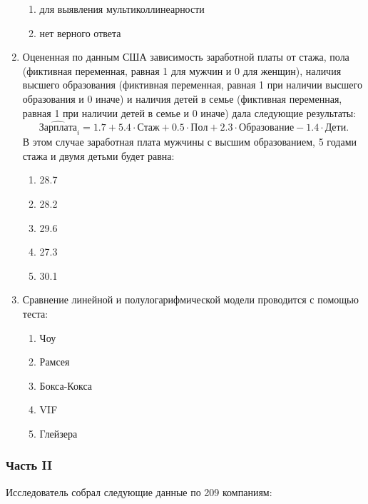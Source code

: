 \begin{enumerate}
\begin{enumerate}
	\item для выявления мультиколлинеарности
	\item нет верного ответа
	\end{enumerate}
\item Оцененная по данным США зависимость заработной платы от стажа, пола (фиктивная переменная, равная 1 для мужчин и 0 для женщин), наличия высшего образования (фиктивная переменная, равная 1 при наличии высшего образования и 0 иначе) и наличия детей в семье (фиктивная переменная, равная 1 при наличии детей в семье и 0 иначе) дала следующие результаты:
 \[
 \hat{Зарплата}_i = 1.7 + 5.4 \cdot Стаж + 0.5 \cdot Пол + 2.3 \cdot Образование - 1.4 \cdot Дети.
 \]
В этом случае заработная плата мужчины с высшим образованием, 5 годами стажа и двумя детьми будет равна:
	\begin{enumerate}
	\item 28.7
	\item 28.2
	\item 29.6
	\item 27.3
	\item 30.1
	\end{enumerate}
\item Сравнение линейной и полулогарифмической модели проводится с помощью теста:
	\begin{enumerate}
	\item Чоу
	\item Рамсея
	\item Бокса-Кокса
	\item VIF
	\item Глейзера
	\end{enumerate}

\end{enumerate}
\subsubsection*{Часть II}

Исследователь собрал следующие данные по 209 компаниям:

